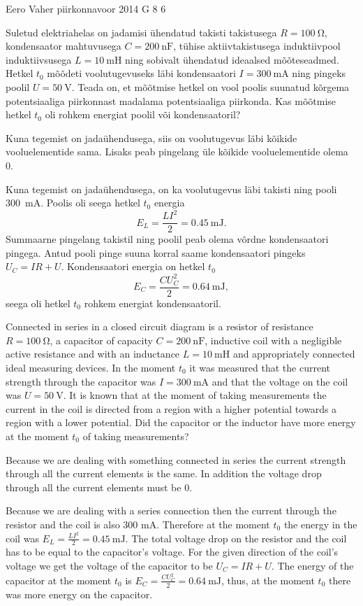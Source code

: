 {Eero Vaher} %
{piirkonnavoor} %
{2014} %
{G 8} %
{6} %
{
\ifStatement
Suletud elektriahelas on jadamisi ühendatud takisti takistusega $R=\SI{100}{\ohm}$, kondensaator mahtuvusega $C=\SI{200}{\nano\farad}$, tühise aktiivtakistusega induktiivpool induktiivsusega $L=\SI{10}{\milli\henry}$ ning sobivalt ühendatud ideaalsed mõõteseadmed. Hetkel $t_0$ mõõdeti voolutugevuseks läbi kondensaatori $I=\SI{300}{\milli\ampere}$ ning pingeks poolil $U=\SI{50}{\volt}$. Teada on, et mõõtmise hetkel on vool poolis suunatud kõrgema potentsiaaliga piirkonnast madalama potentsiaaliga piirkonda. Kas mõõtmise hetkel $t_0$ oli rohkem energiat poolil või kondensaatoril? 
\fi


\ifHint
Kuna tegemist on jadaühendusega, siis on voolutugevus läbi kõikide vooluelementide sama. Lisaks peab pingelang üle kõikide vooluelementide olema \num{0}.
\fi


\ifSolution
Kuna tegemist on jadaühendusega, on ka voolutugevus läbi takisti ning pooli \SI{300}{\milli\ampere}. Poolis oli seega hetkel $t_0$ energia 
\[
E_L=\frac{LI^2}{2}=\SI{0.45}{\milli\joule}.
\]
Summaarne pingelang takistil ning poolil peab olema võrdne kondensaatori pingega. Antud pooli pinge suuna korral saame kondensaatori pingeks $U_C=IR+U$. Kondensaatori energia on hetkel $t_0$ 
\[
E_C=\frac{CU_C^2}{2}=\SI{0.64}{\milli\joule},
\]
seega oli hetkel $t_0$ rohkem energiat kondensaatoril. 
\fi


\ifEngStatement
Connected in series in a closed circuit diagram is a resistor of resistance $R=\SI{100}{\ohm}$, a capacitor of capacity $C=\SI{200}{\nano\farad}$, inductive coil with a negligible active resistance and with an inductance $L=\SI{10}{\milli\henry}$ and appropriately connected ideal measuring devices. In the moment $t_0$ it was measured that the current strength through the capacitor was $I=\SI{300}{\milli\ampere}$ and that the voltage on the coil was $U=\SI{50}{\volt}$. It is known that at the moment of taking measurements the current in the coil is directed from a region with a higher potential towards a region with a lower potential. Did the capacitor or the inductor have more energy at the moment $t_0$ of taking measurements?
\fi


\ifEngHint
Because we are dealing with something connected in series the current strength through all the current elements is the same. In addition the voltage drop through all the current elements must be 0.
\fi


\ifEngSolution
Because we are dealing with a series connection then the current through the resistor and the coil is also 300 mA. Therefore at the moment $t_0$ the energy in the coil was $E_L=\frac{LI^2}{2}=\SI{0.45}{\milli\joule}$. The total voltage drop on the resistor and the coil has to be equal to the capacitor’s voltage. For the given direction of the coil’s voltage we get the voltage of the capacitor to be $U_C=IR+U$. The energy of the capacitor at the moment $t_0$ is $E_C=\frac{CU_C^2}{2}=\SI{0.64}{\milli\joule}$, thus, at the moment $t_0$ there was more energy on the capacitor.
\fi
}
